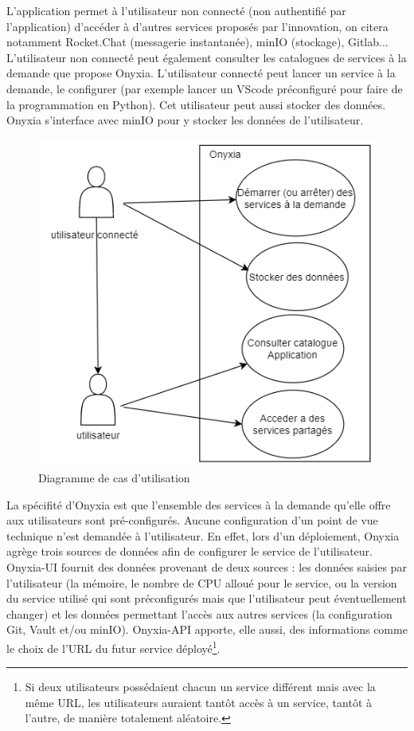 \documentclass[11pt,fleqn]{book} %
\begin{document}
L'application permet à l'utilisateur non connecté (non authentifié par l'application) d'accéder à d'autres services proposés par l'innovation, on citera notamment Rocket.Chat (messagerie instantanée), minIO (stockage), Gitlab... L'utilisateur non connecté peut également consulter les catalogues de services à la demande que propose Onyxia. L'utilisateur connecté peut lancer un service à la demande, le configurer (par exemple lancer un VScode préconfiguré pour faire de la programmation en Python). Cet utilisateur peut aussi stocker des données. Onyxia s'interface avec minIO pour y stocker les données de l'utilisateur.\\
\begin{figure}
    \renewcommand{\figurename}{Diagramme}
    \includegraphics[scale=0.7]{Pictures/onyxia/onyxia-cu.PNG}
    \caption[]{Diagramme de cas d'utilisation \newline}
\end{figure}

La spécifité d'Onyxia est que l'ensemble des services à la demande qu'elle offre aux utilisateurs sont pré-configurés. Aucune configuration d'un point de vue technique n'est demandée à l'utilisateur. En effet, lors d'un déploiement, Onyxia agrège trois sources de données afin de configurer le service de l'utilisateur. \\

Onyxia-UI fournit des données provenant de deux sources : les données saisies par l'utilisateur (la mémoire, le nombre de CPU alloué pour le service, ou la version du service utilisé qui sont préconfigurés mais que l'utilisateur peut éventuellement changer) et les données permettant l'accès aux autres services (la configuration Git, Vault et/ou minIO). Onyxia-API apporte, elle aussi, des informations comme le choix de l'URL du futur service déployé\footnote{Si deux utilisateurs possédaient chacun un service différent mais avec la même URL, les utilisateurs auraient tantôt accès à un service, tantôt à l'autre, de manière totalement aléatoire.}.\\
\end{document}
